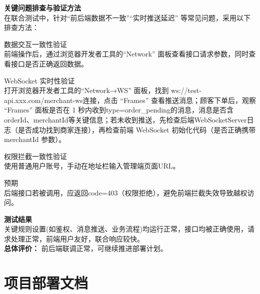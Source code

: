 \begin{levellist}
\begin{levellist}
        \item \textbf{关键问题排查与验证方法} \\
        在联合测试中，针对“前后端数据不一致”“实时推送延迟” 等常见问题，采用以下排查方法：
        \begin{levellist}
            \item 数据交互一致性验证 \\
            前端操作后，通过浏览器开发者工具的“Network” 面板查看接口请求参数，同时查看接口是否正确返回数据。
            \item WebSocket 实时性验证 \\
            打开浏览器开发者工具的“Network→WS” 面板，找到 ws://test-api.xxx.com/merchant-ws连接，点击 “Frames” 查看推送消息；顾客下单后，观察 “Frames” 面板是否在 1 秒内收到type=order\_pending的消息，消息是否含orderId、merchantId等关键信息；若未收到推送，先检查后端WebSocketServer日志（是否成功找到商家连接），再检查前端 WebSocket 初始化代码（是否正确携带 merchantId 参数）。
            \item 权限拦截一致性验证 \\
            使用普通用户账号，手动在地址栏输入管理端页面URL。
            \item 预期 \\
            后端接口若被调用，应返回code=403（权限拒绝），避免前端拦截失效导致越权访问。
        \end{levellist}

        \item \textbf{测试结果} \\
        关键规则设置(如鉴权、消息推送、业务流程)均运行正常，接口均被正确使用，请求处理正常，前端用户友好，联合响应较快。\\
        \textbf{总体评价：} 前后端联调正常，可继续推进部署计划。
    \end{levellist}

\end{levellist}


\section{项目部署文档}

